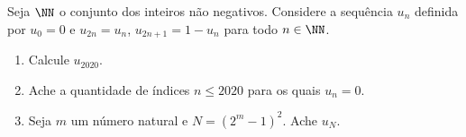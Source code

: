Seja $\NN$ o conjunto dos inteiros não negativos. Considere a sequência $u_n$ definida por $u_0 = 0$ e $u_{2n} = u_n$, $u_{2n+1} = 1 - u_n$ para todo $n \in \NN$.

\begin{enumerate}[label = (\alph*)]
	\item Calcule $u_{2020}$.
	\item Ache a quantidade de índices $n \le 2020$ para os quais $u_n = 0$.
	\item Seja $m$ um número natural e $N = (2^m - 1)^2$. Ache $u_N$.
\end{enumerate}
